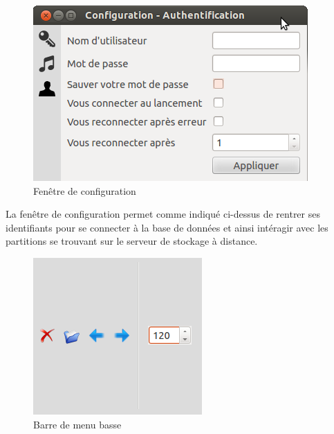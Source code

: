 \begin{figure}[H]
\centering
\includegraphics[scale=0.5]{Config}
\caption{Fenêtre de configuration}
\end{figure}
La fenêtre de configuration permet comme indiqué ci-dessus de rentrer ses identifiants pour se connecter à la base de données et ainsi 
intéragir avec les partitions se trouvant sur le serveur de stockage à distance.

\begin{figure}[H]
\centering
\includegraphics[scale=0.5]{BotApp}
\caption{Barre de menu basse}
\end{figure}
